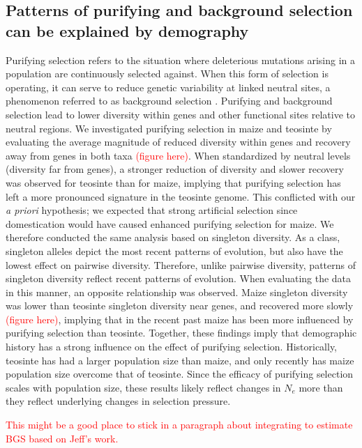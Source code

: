 \documentclass{pnastwo}
\begin{document}
\begin{article}
\subsection{Patterns of purifying and background selection can be explained by demography}
Purifying selection refers to the situation where deleterious
mutations arising in a population are continuously selected against. When this
form of selection is operating, it can serve to reduce genetic
variability at linked neutral sites, a phenomenon referred to as
background selection \cite{charlesworth93}. Purifying and background selection lead
to lower diversity within genes and other functional sites relative
to neutral regions. We investigated purifying
selection in maize and teosinte by evaluating the average magnitude of reduced
diversity within genes and recovery away from genes in both taxa
\textcolor{red}{(figure here)}. When standardized by neutral
levels (diversity far from genes), a stronger reduction of diversity
and slower recovery was observed for teosinte than for maize, implying
that purifying selection has left a more pronounced signature in the
teosinte genome. This conflicted with our \emph{a priori} hypothesis;
we expected that strong artificial selection since domestication would
have caused enhanced purifying selection for maize. We therefore
conducted the same analysis based on singleton diversity. As a class,
singleton alleles depict the most recent patterns of evolution, but
also have the lowest effect on pairwise diversity. Therefore, unlike
pairwise diversity, patterns of singleton
diversity reflect recent patterns of evolution. When
evaluating the data in this manner, an opposite relationship was
observed. Maize singleton diversity was lower than teosinte singleton
diversity near genes, and recovered more slowly
\textcolor{red}{(figure here)}, implying that in the
recent past maize has been more influenced by purifying selection than
teosinte. Together, these findings imply that demographic history has
a strong influence on the effect of purifying selection. Historically,
teosinte has had a larger population size than maize, and only
recently has maize population size overcome that of teosinte. Since
the efficacy of purifying selection scales with population size,
these results likely reflect changes in $N_e$ more than they reflect
underlying changes in selection pressure.

\textcolor{red}{This might be a good place to stick in a paragraph
  about integrating to estimate BGS based on Jeff's work.}


\end{article}
\end{document}
